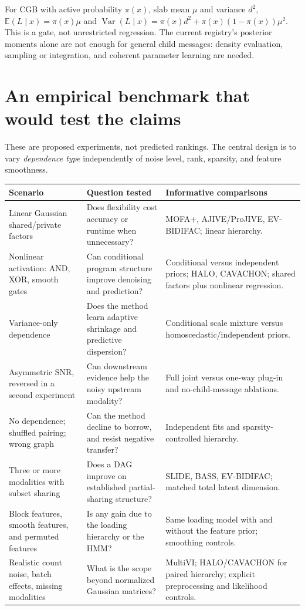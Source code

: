 \documentclass[11pt,a4paper]{article}
\newcommand{\E}{\mathbb E}
\newcommand{\Var}{\operatorname{Var}}
\numberwithin{equation}{section}
\begin{document}
For CGB with active probability \(\pi(x)\), slab mean \(\mu\) and
variance \(d^2\),
\(\E(L\mid x)=\pi(x)\mu\) and
\(\Var(L\mid x)=\pi(x)d^2+\pi(x)(1-\pi(x))\mu^2\).
This is a gate, not unrestricted regression.
The current registry's posterior moments alone are not enough for
general child messages: density evaluation, sampling or integration,
and coherent parameter learning are needed.

\clearpage
\section{An empirical benchmark that would test the claims}

These are proposed experiments, not predicted rankings.
The central design is to vary \emph{dependence type} independently of
noise level, rank, sparsity, and feature smoothness.

\begingroup\small
\renewcommand{\arraystretch}{1.13}
\begin{tabular}{@{}P{.26\textwidth}P{.35\textwidth}P{.33\textwidth}@{}}
\toprule
Scenario & Question tested & Informative comparisons\\
\midrule
Linear Gaussian shared/private factors
& Does flexibility cost accuracy or runtime when unnecessary?
& MOFA+, AJIVE/ProJIVE, EV-BIDIFAC; linear hierarchy.\\[4pt]
Nonlinear activation: AND, XOR, smooth gates
& Can conditional program structure improve denoising and prediction?
& Conditional versus independent priors; HALO, CAVACHON;
shared factors plus nonlinear regression.\\[4pt]
Variance-only dependence
& Does the method learn adaptive shrinkage and predictive dispersion?
& Conditional scale mixture versus homoscedastic/independent priors.\\[4pt]
Asymmetric SNR, reversed in a second experiment
& Can downstream evidence help the noisy upstream modality?
& Full joint versus one-way plug-in and no-child-message ablations.\\[4pt]
No dependence; shuffled pairing; wrong graph
& Can the method decline to borrow, and resist negative transfer?
& Independent fits and sparsity-controlled hierarchy.\\[4pt]
Three or more modalities with subset sharing
& Does a DAG improve on established partial-sharing structure?
& SLIDE, BASS, EV-BIDIFAC; matched total latent dimension.\\[4pt]
Block features, smooth features, and permuted features
& Is any gain due to the loading hierarchy or the HMM?
& Same loading model with and without the feature prior; smoothing controls.\\[4pt]
Realistic count noise, batch effects, missing modalities
& What is the scope beyond normalized Gaussian matrices?
& MultiVI; HALO/CAVACHON for paired hierarchy; explicit
preprocessing and likelihood controls.\\
\bottomrule
\end{tabular}
\endgroup
\end{document}
